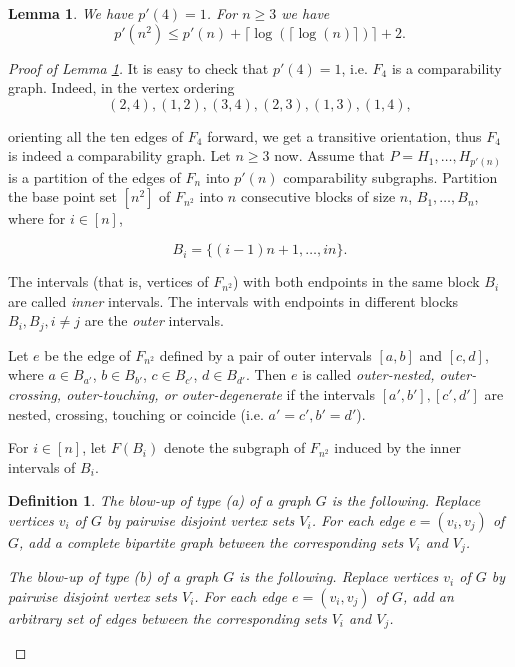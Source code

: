 \documentclass[10pt,a4paper]{amsart}
\newtheorem{lemma}{Lemma}
\newtheorem{definition}{Definition}
\begin{document}
\begin{lemma}\label{rec}  We have $p'(4)=1$. For $n\ge 3$ we have
 $$p'(n^2)\le  p'(n)+ \lceil\log(\lceil\log(n)\rceil)\rceil + 2.$$
\end{lemma}

\begin{proof}[Proof of Lemma \ref{rec}]
It is easy to check that $p'(4)=1$, i.e. $F_4$ is a comparability graph.
Indeed, in the vertex ordering
$$(2,4),(1,2),(3,4),(2,3),(1,3),(1,4),$$

orienting all the ten edges of $F_4$ forward, we get a transitive orientation, thus $F_4$ is indeed a comparability graph.
Let $n\ge 3$ now.
Assume that
$P=H_1,\dots,H_{p'(n)}$ is a partition of the edges of $F_n$ into $p'(n)$
comparability subgraphs. Partition the base point set $[n^2]$ of $F_{n^2}$ into $n$ consecutive blocks of size
$n$,  $B_1,\dots,B_n$, where for $i\in [n]$,

$$B_i=\{(i-1)n+1,\dots,in\}.$$




The intervals (that is, vertices of
$F_{n^2}$)
with both endpoints in the same block $B_i$
are called {\em inner} intervals.
The intervals with endpoints in different blocks $B_i,B_j,
i\ne j$  are the {\em outer} intervals.

Let $e$ be the edge of $F_{n^2}$ defined by a pair of
outer intervals $[a, b]$ and $[c, d]$,
where $a\in B_{a'}$,  $b\in B_{b'}$,   $c\in B_{c'}$,   $d\in B_{d'}$.
Then $e$ is called {\em outer-nested, outer-crossing, outer-touching, or outer-degenerate}
if the intervals $[a',b'],[c',d']$ are nested, crossing, touching or coincide (i.e. $a'=c',b'=d'$).


For $i\in [n]$, let $F(B_i)$ denote the subgraph of $F_{n^2}$ induced by the inner intervals of $B_i$.

\begin{definition}
  The {\em blow-up of type (a)} of a graph $G$ is the following.
  Replace vertices  $v_i$ of $G$ by pairwise disjoint vertex sets $V_i$.
  For each edge $e=(v_i,v_j)$ of $G$, add a complete bipartite graph between
  the corresponding sets $V_i$ and $V_j$.

  The {\em blow-up of type (b)} of a graph $G$ is the following.
Replace vertices  $v_i$ of $G$ by pairwise disjoint vertex sets $V_i$.
  For each edge $e=(v_i,v_j)$ of $G$, add an arbitrary set of edges between
  the corresponding sets $V_i$ and $V_j$.
\end{definition}



\end{proof}
\end{document}
